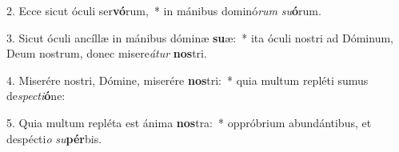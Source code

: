2. Ecce sicut óculi ser\textbf{vó}rum,~*  in mánibus dominó\textit{rum} \textit{su}\textbf{ó}rum.\

3. Sicut óculi ancíllæ in mánibus dóminæ \textbf{su}æ:~*  ita óculi nostri ad Dóminum, Deum nostrum, donec misere\textit{á}\textit{tur} \textbf{nos}tri.\

4. Miserére nostri, Dómine, miserére \textbf{nos}tri:~*  quia multum repléti sumus de\textit{spec}\textit{ti}\textbf{ó}ne:\

5. Quia multum repléta est ánima \textbf{nos}tra:~*  oppróbrium abundántibus, et despécti\textit{o} \textit{su}\textbf{pér}bis.\

